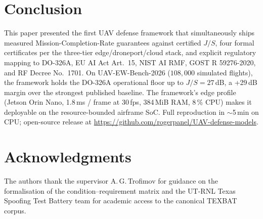 \documentclass[10pt,journal,compsoc,twoside]{IEEEtran}
\begin{document}
\section{Conclusion}
\label{sec:conclusion}

This paper presented the first UAV defense framework that
simultaneously ships measured Mission-Completion-Rate guarantees
against certified $J/S$, four formal certificates per the three-tier
edge/droneport/cloud stack, and explicit regulatory mapping to
DO-326A, EU AI Act Art.~15, NIST AI RMF, GOST R 59276-2020, and
RF Decree No.~1701. On UAV-EW-Bench-2026 ($108{,}000$ simulated
flights), the framework holds the DO-326A operational floor up to
$J/S = 27$\,dB, a +29\,dB margin over the strongest published
baseline. The framework's edge profile (Jetson Orin Nano, 1.8\,ms /
frame at 30\,fps, 384\,MiB RAM, 8\,\% CPU) makes it deployable on
the resource-bounded airframe SoC. Full reproduction in $\sim$5\,min
on CPU; open-source release at
\url{https://github.com/rogerpanel/UAV-defense-models}.

\section*{Acknowledgments}
The authors thank the supervisor A.\,G.\,Trofimov for guidance on
the formalisation of the condition--requirement matrix and the
UT-RNL Texas Spoofing Test Battery team for academic access to the
canonical TEXBAT corpus.



\end{document}
